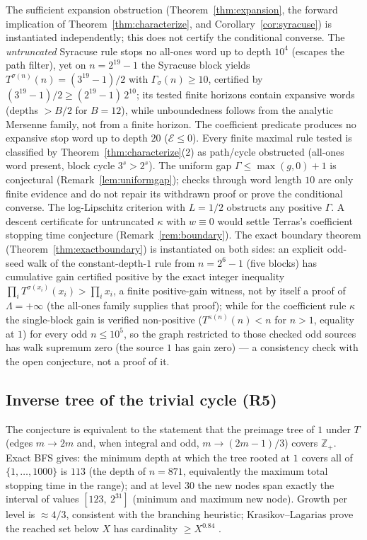 \documentclass[11pt]{amsart}
\theoremstyle{definition}
\theoremstyle{remark}
\newcommand{\Z}{\mathbb{Z}}
\begin{document}
The sufficient expansion obstruction (Theorem~\ref{thm:expansion}, the forward implication of Theorem~\ref{thm:characterize}, and Corollary~\ref{cor:syracuse}) is instantiated independently; this does not certify the conditional converse. The \emph{untruncated} Syracuse rule stops no all-ones word up to depth $10^4$ (escapes the path filter), yet on $n = 2^{19}-1$ the Syracuse block yields $T^{\sigma(n)}(n) = (3^{19}-1)/2$ with $\Gamma_\sigma(n) \ge 10$, certified by $(3^{19}-1)/2 \ge (2^{19}-1)\,2^{10}$; its tested finite horizons contain expansive words (depths $> B/2$ for $B = 12$), while unboundedness follows from the analytic Mersenne family, not from a finite horizon. The coefficient predicate produces no expansive stop word up to depth $20$ ($\mathcal{E} \le 0$). Every finite maximal rule tested is classified by Theorem~\ref{thm:characterize}(2) as path/cycle obstructed (all-ones word present, block cycle $3^s > 2^s$). The uniform gap $\Gamma\le\max(g,0)+1$ is conjectural (Remark~\ref{lem:uniformgap}); checks through word length $10$ are only finite evidence and do not repair its withdrawn proof or prove the conditional converse. The log-Lipschitz criterion with $L = 1/2$ obstructs any positive $\Gamma$. A descent certificate for untruncated $\kappa$ with $w \equiv 0$ would settle Terras's coefficient stopping time conjecture (Remark~\ref{rem:boundary}). The exact boundary theorem (Theorem~\ref{thm:exactboundary}) is instantiated on both sides: an explicit odd-seed walk of the constant-depth-$1$ rule from $n = 2^6 - 1$ (five blocks) has cumulative gain certified positive by the exact integer inequality $\prod_i T^{\sigma(x_i)}(x_i) > \prod_i x_i$, a finite positive-gain witness, not by itself a proof of $\Lambda=+\infty$ (the all-ones family supplies that proof); while for the coefficient rule $\kappa$ the single-block gain is verified non-positive ($T^{\kappa(n)}(n) < n$ for $n>1$, equality at $1$) for every odd $n \le 10^5$, so the graph restricted to those checked odd sources has walk supremum zero (the source $1$ has gain zero) --- a consistency check with the open conjecture, not a proof of it.

\subsection{Inverse tree of the trivial cycle (R5)}\label{sec:results-tree}
The conjecture is equivalent to the statement that the preimage tree of $1$ under $T$ (edges $m \to 2m$ and, when integral and odd, $m \to (2m-1)/3$) covers $\Z_+$. Exact BFS gives: the minimum depth at which the tree rooted at $1$ covers all of $\{1,\dots,1000\}$ is $113$ (the depth of $n = 871$, equivalently the maximum total stopping time in the range); and at level $30$ the new nodes span exactly the interval of values $[123,\ 2^{31}]$ (minimum and maximum new node). Growth per level is $\approx 4/3$, consistent with the branching heuristic; Krasikov--Lagarias prove the reached set below $X$ has cardinality $\ge X^{0.84}$ \cite{krasikovlagarias2003}.
\end{document}
